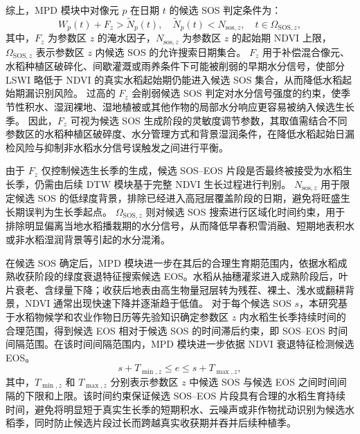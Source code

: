 综上，MPD 模块中对像元 \(p\) 在日期 \(t\) 的候选 SOS 判定条件为：
\begin{equation}
    W_p(t)+F_z>\widetilde{N}_p(t), \quad
\widetilde{N}_p(t)<N_{\mathrm{sos},z}, \quad
    t\in\Omega_{\mathrm{SOS},z},
    \label{eq:sos_condition}
\end{equation}
其中，\(F_z\) 为参数区 \(z\) 的淹水因子，\(N_{\mathrm{sos},z}\) 为参数区 \(z\) 的起始期 NDVI 上限，\(\Omega_{\mathrm{SOS},z}\) 表示参数区 \(z\) 内候选 SOS 的允许搜索日期集合。
\(F_z\) 用于补偿混合像元、水稻种植区破碎化、间歇灌溉或雨养条件下可能被削弱的早期水分信号，使部分 LSWI 略低于 NDVI 的真实水稻起始期仍能进入候选 SOS 集合，从而降低水稻起始期漏识别风险。
过高的 \(F_z\) 会削弱候选 SOS 判定对水分信号强度的约束，使季节性积水、湿润裸地、湿地植被或其他作物的局部水分响应更容易被纳入候选生长季。
因此，\(F_z\) 可视为候选 SOS 生成阶段的灵敏度调节参数，其取值需结合不同参数区的水稻种植区破碎度、水分管理方式和背景湿润条件，在降低水稻起始日漏检风险与抑制非水稻水分信号误触发之间进行平衡。

由于 \(F_z\) 仅控制候选生长季的生成，候选 SOS--EOS 片段是否最终被接受为水稻生长季，仍需由后续 DTW 模块基于完整 NDVI 生长过程进行判别。
\(N_{\mathrm{sos},z}\) 用于限定候选 SOS 的低绿度背景，排除已经进入高冠层覆盖阶段的日期，避免将旺盛生长期误判为生长季起点。
\(\Omega_{\mathrm{SOS},z}\) 则对候选 SOS 搜索进行区域化时间约束，用于排除明显偏离当地水稻播栽期的水分信号，从而降低早春积雪消融、短期地表积水或非水稻湿润背景等引起的水分混淆\cite{Zhang2015ISPRS,Qin2015ISPRS}。

在候选 SOS 确定后，MPD 模块进一步在其后的合理生育期范围内，依据水稻成熟收获阶段的绿度衰退特征搜索候选 EOS。水稻从抽穗灌浆进入成熟阶段后，叶片衰老、含绿量下降；收获后地表由高生物量冠层转为残茬、裸土、浅水或翻耕背景，NDVI 通常出现快速下降并逐渐趋于低值。
对于每个候选 SOS \(s\)，本研究基于水稻物候学和农业作物日历等先验知识确定参数区 \(z\) 内水稻生长季持续时间的合理范围，得到候选 EOS 相对于候选 SOS 的时间滞后约束，即 SOS--EOS 时间间隔范围。在该时间间隔范围内，MPD 模块进一步依据 NDVI 衰退特征检测候选 EOS。
\begin{equation}
    s+T_{\min,z}\leq e\leq s+T_{\max,z},
    \label{eq:growing_length}
\end{equation}
其中，\(T_{\min,z}\) 和 \(T_{\max,z}\) 分别表示参数区 \(z\) 中候选 SOS 与候选 EOS 之间时间间隔的下限和上限。该时间约束保证候选 SOS--EOS 片段具有合理的水稻生育持续时间，避免将明显短于真实生长季的短期积水、云噪声或非作物扰动识别为候选水稻季，同时防止候选片段过长而跨越真实收获期并吞并后续种植季。

